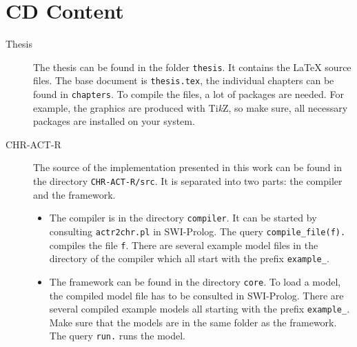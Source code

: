 \chapter{CD Content}
\label{appendix:cd_content}

\begin{description}
 \item[Thesis] The thesis can be found in the folder \lstinline|thesis|. It contains the \LaTeX{} source files. The base document is \lstinline|thesis.tex|, the individual chapters can be found in \lstinline|chapters|. To compile the files, a lot of packages are needed. For example, the graphics are produced with Ti\emph{k}Z, so make sure, all necessary packages are installed on your system.
 \item[CHR-ACT-R] The source of the implementation presented in this work can be found in the directory \lstinline|CHR-ACT-R/src|. It is separated into two parts: the compiler and the framework.
 \begin{itemize}
  \item The compiler is in the directory \lstinline|compiler|. It can be started by consulting \lstinline|actr2chr.pl| in SWI-Prolog. The query \lstinline|compile_file(f).| compiles the file \lstinline|f|. There are several example model files in the directory of the compiler which all start with the prefix \lstinline|example_|.
  \item The framework can be found in the directory \lstinline|core|. To load a model, the compiled model file has to be consulted in SWI-Prolog. There are several compiled example models all starting with the prefix \lstinline|example_|. Make sure that the models are in the same folder as the framework. The query \lstinline|run.| runs the model.
 \end{itemize}
\end{description}
